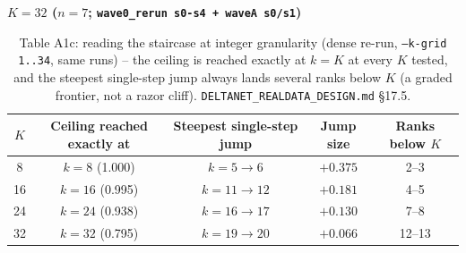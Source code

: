\begin{table}[htbp]
\vspace{8pt}
\textbf{$K=32$ ($n=7$; \texttt{wave0\_rerun s0-s4 + waveA s0/s1})}\\[2pt]
\caption{Table A1b: the full $h{=}1$ eval-truncation staircase (fixed grid
$\cup$ $K$-local window), \texttt{recovered\_frac@0.9}, mean $\pm$ std
across seeds. ``measured'' = $S_T^{raw}$ truncated to rank $k$;
``ideal-truncated'' = $s_{ideal,effective}$ (the entity-aligned expectation
from the dumped key/value Grams for this run's own non-orthonormal keys)
truncated the same way; ``theory'' = the closed-form $(K-m)/K$ formula
under the orthonormal-key idealization, reference only. Bold = the run's
own $K$. \texttt{DELTANET\_REALDATA\_DESIGN.md} \S17.4.}
\end{table}

\begin{table}[htbp]
\centering
\small
\begin{tabular}{ccccc}
\toprule
$K$ & Ceiling reached exactly at & Steepest single-step jump & Jump size & Ranks below $K$ \\
\midrule
8  & $k{=}8$ (1.000)  & $k{=}5\to6$   & $+0.375$ & 2--3 \\
16 & $k{=}16$ (0.995) & $k{=}11\to12$ & $+0.181$ & 4--5 \\
24 & $k{=}24$ (0.938) & $k{=}16\to17$ & $+0.130$ & 7--8 \\
32 & $k{=}32$ (0.795) & $k{=}19\to20$ & $+0.066$ & 12--13 \\
\bottomrule
\end{tabular}
\caption{Table A1c: reading the staircase at integer granularity (dense
re-run, \texttt{--k-grid 1..34}, same runs) -- the ceiling is reached
exactly at $k{=}K$ at every $K$ tested, and the steepest single-step jump
always lands several ranks below $K$ (a graded frontier, not a razor
cliff). \texttt{DELTANET\_REALDATA\_DESIGN.md} \S17.5.}
\end{table}

